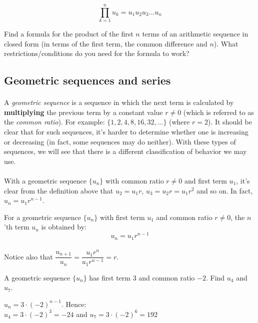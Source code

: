\documentclass[12pt, a4paper, titlepage, twoside]{article}
\newcounter{excount}[subsection]
\begin{document}
	$$\displaystyle \prod_{k=1}^n u_k = u_1 u_2 u_3 ... u_n$$
	
	Find a formula for the product of the first $n$ terms of an arithmetic sequence in closed form (in terms of the first term,
	the common difference and $n$). What restrictions/conditions do you need for the formula to work?
	
	\hfill
	
	\subsection{Geometric sequences and series}
	
	\paragraph{}
	A \textit{geometric sequence} is a sequence in which the next term is calculated by \textbf{multiplying} the previous
	term by a constant value $r \neq 0$ (which is referred to as the \textit{common ratio}). For example: $\{1, 2, 4, 8, 16, 32,...\}$ 
	(where $r=2$). It should be clear that for such
	sequences, it's harder to determine whether one is increasing or decreasing (in fact, some sequences may do neither). With these
	types of sequences, we will see that there is a different classification of behavior we may use.
	
	\paragraph{}
	With a geometric sequence $\{u_n\}$ with common ratio $r \neq 0$ and first term $u_1$, it's clear from the definition above
	that $u_2 = u_1 r$, $u_3 = u_2 r = u_1 r^2$ and so on. In fact, $u_n = u_1 r^{n-1}$.\\
	
	\begin{kp}
		For a geometric sequence $\{u_n\}$ with first term $u_1$ and common ratio $r \neq 0$, the $n$'th term $u_n$ is obtained by: 
		$$u_n = u_1 r^{n-1}$$
	\end{kp}
	
	\paragraph{}
	Notice also that $\dfrac{u_{n+1}}{u_n} = \dfrac{u_1 r^n} {u_1 r^{n-1}} = r$.\\
	
	\begin{ex}
		A geometric sequence $\{u_n\}$ has first term $3$ and common ratio $-2$. Find $u_4$ and $u_7$.
		
		\tcbline
		\hfill
		
		$u_n = 3 \cdot (-2)^{n-1}$. Hence: \\
		$u_4 = 3 \cdot (-2)^{3} = -24$ and $u_7 = 3 \cdot (-2)^{6} = 192$ 
	\end{ex}
	
\end{document}
